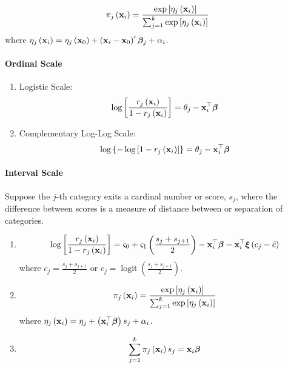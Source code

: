 \begin{equation}
	\pi_{j}\left({\bf x}_{i}\right)=\frac{\exp \left[\eta_{j}\left({\bf x}_{i}\right)\right]}{\sum_{j=1}^{k} \exp \left[\eta_{j}\left({\bf x}_{i}\right)\right]}
\end{equation}
where $\eta_{j}\left({\bf x}_{i}\right)=\eta_{j}\left({\bf x}_{0}\right)+\left({\bf x}_{i}-{\bf x}_{0}\right)^{\prime}\boldsymbol{\beta}_{j}+\alpha_{i}$.

\paragraph*{Ordinal Scale}

\begin{enumerate}
	\item Logistic Scale:
	      \begin{equation}
		      \log\left[\frac{r_{j}\left({\bf x}_{i}\right)}{1-r_{j}\left({\bf x}_{i}\right)}\right]=\theta_{j}-{\bf x}_{i}^{\top}\boldsymbol{\beta}
	      \end{equation}
	\item Complementary Log-Log Scale:
	      \begin{equation}
		      \log\left\{-\log\left[1-r_{j}\left({\bf x}_{i}\right)\right]\right\}=\theta_{j}-{\bf x}_{i}^{\top}\boldsymbol{\beta}
	      \end{equation}
\end{enumerate}

\paragraph*{Interval Scale}

Suppose the $j$-th category exits a cardinal number or score, $s_j$, where the difference between scores is a measure of distance between or separation of categories.

\begin{enumerate}
	\item \begin{equation}
		      \log\left[\frac{r_{j}\left({\bf x}_{i}\right)}{1-r_{j}\left({\bf x}_{i}\right)}\right]=\varsigma_{0}+\varsigma_{1}\left(\frac{s_{j}+s_{j+1}}{2}\right)-{\bf x}_{i}^{\top}\boldsymbol{\beta}-{\bf x}_{i}^{\top}\boldsymbol{\xi}\left(c_{j}-\bar{c}\right)
	      \end{equation}
	      where $c_{j}=\frac{s_{j}+s_{j+1}}{2}$ or $c_{j}=\operatorname{logit}\left(\frac{s_{j}+s_{j+1}}{2}\right)$.
	\item \begin{equation}
		      \pi_{j}\left({\bf x}_{i}\right)=\frac{\exp \left[\eta_{j}\left({\bf x}_{i}\right)\right]}{\sum_{j=1}^{k} \exp \left[\eta_{j}\left({\bf x}_{i}\right)\right]}
	      \end{equation}
	      where $\eta_{j}\left({\bf x}_{i}\right)=\eta_{j}+\left({\bf x}_{i}^{\top}\boldsymbol{\beta}\right)s_{j}+\alpha_{i}$.
	\item \begin{equation}
		      \sum_{j=1}^{k}\pi_{j}\left({\bf x}_{i}\right)s_{j}={\bf x}_{i}\boldsymbol{\beta}
	      \end{equation}
\end{enumerate}

